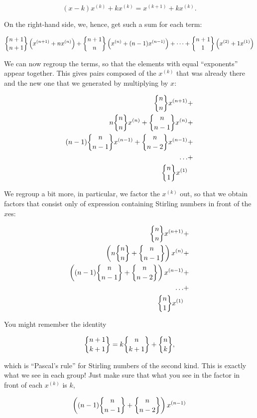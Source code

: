 \documentclass[tikz]{scrreprt}
\begin{document}
\[
(x-k)x^{(k)} + kx^{(k)} = x^{(k+1)} + kx^{(k)}.
\]

On the right-hand side, we, hence, get such a sum for each term:

\[
\stirlingTwo{n+1}{n+1}\left(x^{(n+1)} + nx^{(n)}\right) + 
\stirlingTwo{n+1}{n}\left(x^{(n)} + (n-1)x^{(n-1)}\right) + \dots + 
\stirlingTwo{n+1}{1}\left(x^{(2)} + 1 x^{(1)}\right)
\]

We can now regroup the terms, so that the elements with equal
``exponents'' appear together. This gives pairs composed
of the $x^{(k)}$ that was already there and the new one
that we generated by multiplying by $x$:

\begin{align*}
\stirlingTwo{n}{n}x^{(n+1)} & + \\
n\stirlingTwo{n}{n}x^{(n)}  + 
\stirlingTwo{n}{n-1}x^{(n)} & + \\
(n-1)\stirlingTwo{n}{n-1}x^{(n-1)} + 
\stirlingTwo{n}{n-2}x^{(n-1)} & + \\
\dots & + \\
\stirlingTwo{n}{1}x^{(1)} &
\end{align*}

We regroup a bit more, in particular, we
factor the $x^{(k)}$ out, so that we obtain
factors that consist only of expression containing
Stirling numbers in front of the $x$es:

\begin{align*}
\stirlingTwo{n}{n}x^{(n+1)} & + \\
\left(n\stirlingTwo{n}{n} + \stirlingTwo{n}{n-1}\right)x^{(n)} & + \\
\left((n-1)\stirlingTwo{n}{n-1} + \stirlingTwo{n}{n-2}\right)x^{(n-1)} & + \\ 
\dots & + \\
\stirlingTwo{n}{1}x^{(1)} &
\end{align*}

You might remember the identity

\begin{equation}
\stirlingTwo{n+1}{k+1} = k\stirlingTwo{n}{k+1} + \stirlingTwo{n}{k},
\end{equation}

which is ``Pascal's rule'' for Stirling numbers of the second kind.
This is exactly what we see in each group! Just make sure that
what you see in the factor in front of each $x^{(k)}$ is $k$,
\eg\

\[
\left((n-1)\stirlingTwo{n}{n-1} + \stirlingTwo{n}{n-2}\right)x^{(n-1)}
\]
\end{document}
